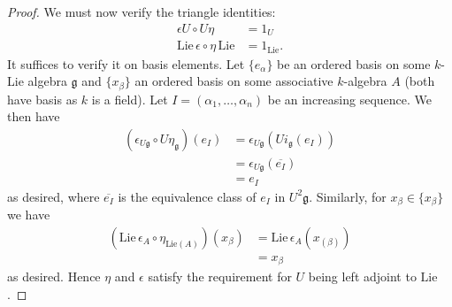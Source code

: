 \begin{proof}
  We must now verify the triangle identities:
  \begin{align*}
    \epsilon U \circ U\eta &= 1_U \\
    \text{Lie}\,\epsilon \circ \eta\,\text{Lie} &= 1_{\text{Lie}}.
  \end{align*}
  It suffices to verify it on basis elements. Let $ \{e_\alpha\} $ be an ordered basis on some $ k $-Lie algebra $ \mathfrak{g} $ and $ \{x_\beta\} $ an ordered basis on some associative $ k $-algebra $ A $ (both have basis as $ k $ is a field). Let $ I = (\alpha_1, \ldots, \alpha_n) $ be an increasing sequence. We then have
  \begin{align*}
    (\epsilon_{U\mathfrak{g}} \circ U\eta_\mathfrak{g})(e_I) &= \epsilon_{U\mathfrak{g}}(Ui_\mathfrak{g}(e_I)) \\
                                                             &= \epsilon_{U\mathfrak{g}}(\overline{e_I}) \\
                                                             &= e_I
  \end{align*}
  as desired, where $ \overline{e_I} $ is the equivalence class of $ e_I $ in $ U^2\mathfrak{g} $. Similarly, for $ x_\beta \in \{x_\beta\} $ we have
  \begin{align*}
    (\text{Lie}\,\epsilon_A \circ \eta_{\text{Lie}(A)})(x_\beta) &= \text{Lie}\,\epsilon_A (x_{(\beta)}) \\
                                                        &= x_\beta
  \end{align*}
  as desired. Hence $ \eta $ and $  \epsilon $ satisfy the requirement for $ U $ being left adjoint to $ \text{Lie} $.
\end{proof}




